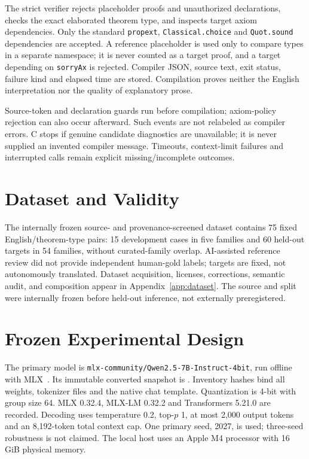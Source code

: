 \documentclass[runningheads,a4paper]{llncs}
\begin{document}
The strict verifier rejects placeholder proofs and unauthorized declarations,
checks the exact elaborated theorem type, and inspects target axiom dependencies.
Only the standard \texttt{propext}, \texttt{Classical.choice} and
\texttt{Quot.sound} dependencies are accepted. A reference placeholder is used
only to compare types in a separate namespace; it is never counted as a target
proof, and a target depending on \texttt{sorryAx} is rejected. Compiler JSON,
source text, exit status, failure kind and elapsed time are stored. Compilation
proves neither the English interpretation nor the quality of explanatory prose.

Source-token and declaration guards run before compilation; axiom-policy
rejection can also occur afterward. Such events are not relabeled as compiler
errors. C stops if genuine candidate diagnostics are unavailable;
it is never supplied an invented compiler message. Timeouts, context-limit
failures and interrupted calls remain explicit missing/incomplete outcomes.

\section{Dataset and Validity}
The internally frozen source- and provenance-screened dataset contains
75 fixed English/theorem-type pairs: 15 development cases in five
families and 60 held-out targets in 54 families, without curated-family
overlap. AI-assisted reference review did not provide independent
human-gold labels; targets are fixed, not autonomously translated.
Dataset acquisition, licenses, corrections, semantic audit, and
composition appear in Appendix~\ref{app:dataset}.
The source and split were internally frozen before held-out inference,
not externally preregistered.

\section{Frozen Experimental Design}
The primary model is \texttt{mlx-community/Qwen2.5-7B-Instruct-4bit}, run
offline with MLX~\cite{qwenmlx,mlxlm}. Its immutable converted snapshot is
. Inventory hashes bind all weights, tokenizer files and
the native chat template. Quantization is 4-bit with group size 64. MLX 0.32.4,
MLX-LM 0.32.2 and Transformers 5.21.0 are recorded. Decoding uses temperature
0.2, top-$p$ 1, at most 2,000 output tokens and an 8,192-token total context cap.
One primary seed, 2027, is used; three-seed robustness is not claimed.
The local host uses an Apple M4 processor with 16 GiB physical memory.
\end{document}

